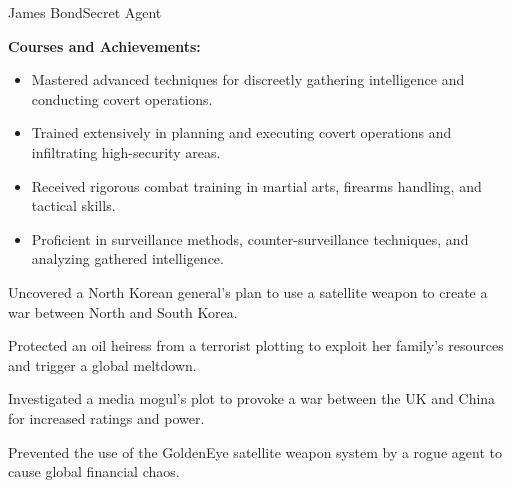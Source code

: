 \documentclass{article}
\begin{document}
\begin{cv}[avatar]{James Bond}{Secret Agent}
\begin{cvevent}[1958][1962]
    \textbf{Courses and Achievements:}
    \begin{itemize}
        \item Mastered advanced techniques for discreetly gathering intelligence and conducting covert operations.
        \item Trained extensively in planning and executing covert operations and infiltrating high-security areas.
        \item Received rigorous combat training in martial arts, firearms handling, and tactical skills.
        \item Proficient in surveillance methods, counter-surveillance techniques, and analyzing gathered intelligence.
    \end{itemize}
\end{cvevent}


\begin{cvevent}[2002]
    Uncovered a North Korean general's plan to use a satellite weapon to create a war between North and South Korea.
\end{cvevent}

\cvseparator[2]
\begin{cvevent}[1999]
    Protected an oil heiress from a terrorist plotting to exploit her family's resources and trigger a global meltdown.
\end{cvevent}

\cvseparator[2]
\begin{cvevent}[1997]
    Investigated a media mogul's plot to provoke a war between the UK and China for increased ratings and power.
\end{cvevent}

\cvseparator[2]
\begin{cvevent}[1995]
    Prevented the use of the GoldenEye satellite weapon system by a rogue agent to cause global financial chaos.
\end{cvevent}



\end{cv}
\end{document}
